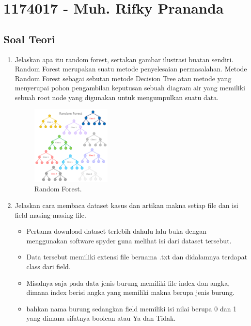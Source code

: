\section{1174017 - Muh. Rifky Prananda}
\subsection{Soal Teori}
\begin{enumerate}

	\item Jelaskan apa itu random forest, sertakan gambar ilustrasi buatan sendiri.
	\hfill\break
	Random Forest merupakan suatu metode penyelesaian permasalahan. Metode Random Forest sebagai sebutan metode Decision Tree atau metode yang menyerupai pohon pengambilan keputusan sebuah diagram air yang memiliki sebuah root node yang digunakan untuk mengumpulkan suatu data.

	\begin{figure}[H]
	\centering
		\includegraphics[width=4cm]{figures/1174017/3/teori/RandomForest.PNG}
		\caption{Random Forest.}
	\end{figure}

	\item Jelaskan cara membaca dataset kasus dan artikan makna setiap file dan isi field masing-masing file.
	\hfill\break

	\begin{itemize}
		\item Pertama download dataset terlebih dahulu lalu buka dengan menggunakan software spyder guna melihat isi dari dataset tersebut.

		\item Data tersebut memiliki extensi file bernama .txt dan didalamnya terdapat class dari field.

		\item Misalnya saja pada data jenis burung memiliki file index dan angka, dimana index berisi angka yang memiliki makna berupa jenis burung.

		\item bahkan nama burung sedangkan field memiliki isi nilai berupa 0 dan 1 yang dimana sifatnya boolean atau Ya dan Tidak.


\end{itemize}
\end{enumerate}
